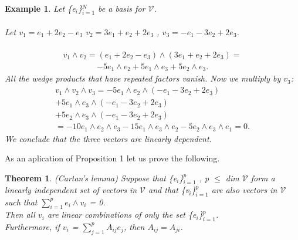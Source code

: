 \documentclass[12pt,a4paper]{article}
\newtheorem{thm}{Theorem}
\newtheorem{exmp}{Example}[section]
\begin{document}
\begin{exmp}
Let \{e$_i$\}$^N_{i=1}$ be a basis for $\mathcal{V}$. \\\\Let $v_1 = e_1 + 2e_2 - e_3$ $v_2 = 3e_1 + e_2 + 2e_3$ , $v_3 = -e_1 - 3e_2 + 2 e_3$.\\\\
\begin{align*}
v_1 \wedge v_2 = ( e_1 + 2e_2 - e_3) \wedge (3e_1 + e_2 + 2e_3)=
\end{align*}
\begin{align*}
 -5e_1 \wedge e_2 + 5e_1 \wedge e_3 + 5 e_2 \wedge e_3.
\end{align*}	
All the wedge products that have repeated factors vanish. Now we multiply
by $v_3$: 
\begin{align*}
v_1 \wedge v_2 \wedge v_3 = -5e_1 \wedge e_2 \wedge ( -e_1 - 3e_2 + 2e_3) \\+ 5e_1 \wedge e_3 \wedge ( -e_1 -3e_2 + 2e_3)  \\+5e_2 \wedge
e_3 \wedge (-e_1 - 3e_2 + 2e_3)\\
= -10e_1 \wedge e_2 \wedge e_3 - 15e_1 \wedge e_3 \wedge e_2 - 5e_2 \wedge e_3 \wedge e_1 = 0.
\end{align*}
We conclude that the three vectors are linearly dependent.
\end{exmp}
As an aplication of Proposition 1 let us prove the following.\\
\begin{thm}
(Cartan’s lemma) Suppose that \{e$_i$\}$^p_{i=1}$ , p $\leq$ dim $\mathcal{V}$ form
a linearly independent set of vectors in $\mathcal{V}$ and that  \{v$_i$\}$^p_{i=1}$ are also vectors
in $\mathcal{V}$ such that $\sum^{p}_{i=1} e_i \wedge v_i$ = 0. \\
Then all $v_i$ are linear combinations of only
the set \{e$_i$\}$^p_{i=1}$. \\Furthermore, if $v_i$ = $\sum^p_{j=1} A_{ij}e_{j}$, then $A_{ij} = A_{ji}$.
\end{thm}
\end{document}
